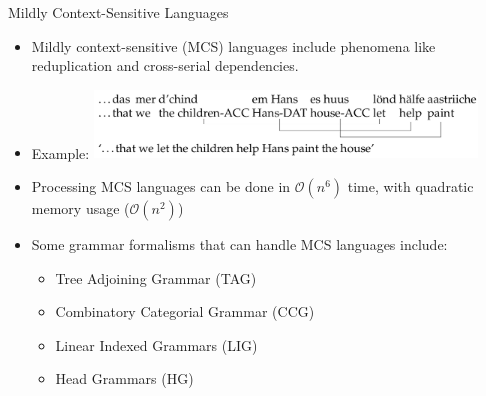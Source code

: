 \documentclass{beamer}
\newcommand{\detail}[1]{{\color{lightgrey}\small{}#1}}
\begin{document}
\begin{frame}{Mildly Context-Sensitive Languages}
\begin{block}{}
\begin{itemize}
	\item Mildly context-sensitive (MCS) languages include phenomena like reduplication and cross-serial dependencies.
	\item Example:\pause
	\includegraphics[width=0.80\textwidth]{images/swiss_cross_serial_deps.png}
	\pause
	\item Processing MCS languages can be done in $\mathcal{O}(n^6)$ time, with quadratic memory usage \detail{($\mathcal{O}(n^2)$)}
	\pause
	\item Some grammar formalisms that can handle MCS languages include:
	\begin{itemize}
		\item Tree Adjoining Grammar (TAG)
		\item Combinatory Categorial Grammar (CCG)
		\item Linear Indexed Grammars (LIG)
		\item Head Grammars (HG)
	\end{itemize}
\end{itemize}
\end{block}
\end{frame}
\end{document}
